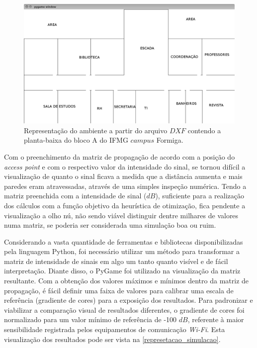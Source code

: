 \documentclass[
	12pt,				%
	twoside,			%
	a4paper,			%
	english,			%
	french,				%
	spanish,			%
	brazil				%
	]{abntex2}
\begin{document}
\begin{figure}[ht]
    \caption{\label{repre_ambiente_dxf_2} Representação do ambiente a partir do arquivo $DXF$ contendo a planta-baixa do bloco A do IFMG $campus$ Formiga.}
    \begin{center}
        \includegraphics[scale=0.4]{imagens/planta-labels.jpg}
    \end{center}
\end{figure}

Com o preenchimento da matriz de propagação de acordo com a posição do
\emph{access point} e com o respectivo valor da intensidade do sinal, se
tornou difícil a visualização de quanto o sinal ficava a medida que a
distância aumenta e mais paredes eram atravessadas, através de uma
simples inspeção numérica. Tendo a matriz preenchida com a intensidade
de sinal (\(dB\)), suficiente para a realização dos cálculos com a
função objetivo da heurística de otimização, fica pendente a
visualização a olho nú, não sendo viável distinguir dentre milhares de
valores numa matriz, se poderia ser considerada uma simulação boa ou
ruim.

Considerando a vasta quantidade de ferramentas e bibliotecas
disponibilizadas pela linguagem Python, foi necessário utilizar um
método para transformar a matriz de intensidade de sinais em algo um
tanto quanto visível e de fácil interpretação. Diante disso, o PyGame
foi utilizado na visualização da matriz resultante. Com a obtenção dos
valores máximos e mínimos dentro da matriz de propagação, é fácil
definir uma faixa de valores para calibrar uma escala de referência
(gradiente de cores) para a exposição dos resultados. Para padronizar e
viabilizar a comparação visual de resultados diferentes, o gradiente de
cores foi normalizado para um valor mínimo de referência de -100 \(dB\),
referente à maior sensibilidade registrada pelos equipamentos de
comunicação \emph{Wi-Fi}. Esta visualização dos resultados pode ser
vista na \autoref{represetacao_simulacao}.
\end{document}
